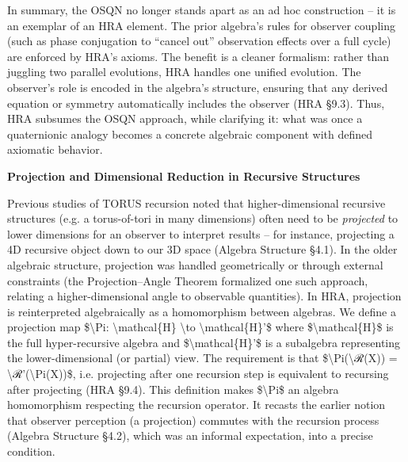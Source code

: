 \documentclass[]{article}
\begin{document}
In summary, the OSQN no longer stands apart as an ad hoc construction --
it is an exemplar of an HRA element. The prior algebra's rules for
observer coupling (such as phase conjugation to ``cancel out''
observation effects over a full cycle) are enforced by HRA's axioms. The
benefit is a cleaner formalism: rather than juggling two parallel
evolutions, HRA handles one unified evolution. The observer's role is
encoded in the algebra's structure, ensuring that any derived equation
or symmetry automatically includes the observer (HRA §9.3). Thus, HRA
subsumes the OSQN approach, while clarifying it: what was once a
quaternionic analogy becomes a concrete algebraic component with defined
axiomatic behavior.

\textbf{Projection and Dimensional Reduction in Recursive Structures}

Previous studies of TORUS recursion noted that higher-dimensional
recursive structures (e.g. a torus-of-tori in many dimensions) often
need to be \emph{projected} to lower dimensions for an observer to
interpret results -- for instance, projecting a 4D recursive object down
to our 3D space (Algebra Structure §4.1). In the older algebraic
structure, projection was handled geometrically or through external
constraints (the Projection--Angle Theorem formalized one such approach,
relating a higher-dimensional angle to observable quantities). In HRA,
projection is reinterpreted algebraically as a homomorphism between
algebras. We define a projection map \$\textbackslash{}Pi:
\textbackslash{}mathcal\{H\} \textbackslash{}to
\textbackslash{}mathcal\{H\}'\$ where \$\textbackslash{}mathcal\{H\}\$
is the full hyper-recursive algebra and
\$\textbackslash{}mathcal\{H\}'\$ is a subalgebra representing the
lower-dimensional (or partial) view. The requirement is that
\$\textbackslash{}Pi(\textbackslash{}ℛ(X)) =
\textbackslash{}ℛ'(\textbackslash{}Pi(X))\$, i.e. projecting after one
recursion step is equivalent to recursing after projecting (HRA §9.4).
This definition makes \$\textbackslash{}Pi\$ an algebra homomorphism
respecting the recursion operator. It recasts the earlier notion that
observer perception (a projection) commutes with the recursion process
(Algebra Structure §4.2), which was an informal expectation, into a
precise condition.
\end{document}
